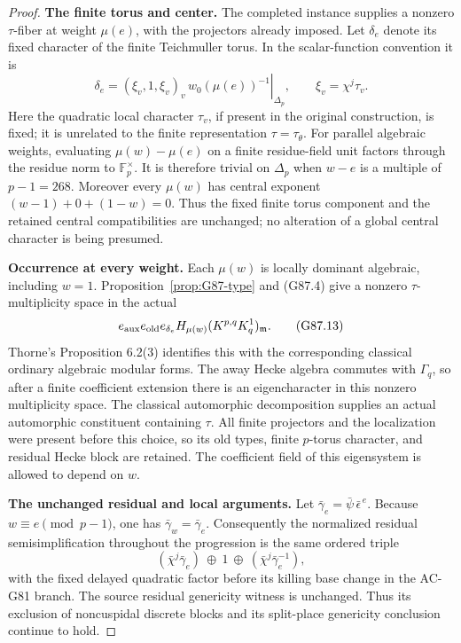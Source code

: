 \begin{proof}
\noindent\textbf{The finite torus and center.}
The completed instance supplies a nonzero \(\tau\)-fiber at weight
\(\mu(e)\), with the projectors already imposed.
Let \(\delta_e\) denote its fixed character of the finite Teichmuller
torus.  In the scalar-function convention it is
\[
 \delta_e=
 \left.(\xi_v,1,\xi_v)_v\,
         w_0(\mu(e))^{-1}\right|_{\Delta_p},
 \qquad \xi_v=\chi^j\tau_v .
 \tag{G87.12}
\]
Here the quadratic local character \(\tau_v\), if present in the
original construction, is fixed; it is unrelated to the finite
representation \(\tau=\tau_\theta\).
For parallel algebraic weights, evaluating
\(\mu(w)-\mu(e)\) on a finite residue-field unit factors through
the residue norm to \(\mathbb F_p^\times\).
It is therefore trivial on \(\Delta_p\) when
\(w-e\) is a multiple of \(p-1=268\).
Moreover every \(\mu(w)\) has central exponent
\((w-1)+0+(1-w)=0\).
Thus the fixed finite torus component and the retained central
compatibilities are unchanged; no alteration of a global central
character is being presumed.

\noindent\textbf{Occurrence at every weight.}
Each \(\mu(w)\) is locally dominant algebraic, including \(w=1\).
Proposition~\ref{prop:G87-type} and (G87.4) give a nonzero
\(\tau\)-multiplicity space in the actual
\[
 e_{\rm aux}e_{\rm old}e_{\delta_e}
 H_{\mu(w)}(K^{p,q}K_q^1)_{\mathfrak m}.
 \tag{G87.13}
\]
Thorne's Proposition 6.2(3) identifies this with the corresponding
classical ordinary algebraic modular forms.
The away Hecke algebra commutes with \(\Gamma_q\), so after a finite
coefficient extension there is an eigencharacter in this nonzero
multiplicity space. The classical automorphic decomposition supplies
an actual automorphic constituent containing \(\tau\).
All finite projectors and the localization were present before this
choice, so its old types, finite \(p\)-torus character, and residual
Hecke block are retained.
The coefficient field of this eigensystem is allowed to depend on
\(w\).

\noindent\textbf{The unchanged residual and local arguments.}
Let
\(\bar\gamma_e=\bar\psi\,\bar\epsilon^{\,e}\).
Because \(w\equiv e\pmod{p-1}\), one has
\(\bar\gamma_w=\bar\gamma_e\).
Consequently the normalized residual semisimplification throughout
the progression is the same ordered triple
\[
 (\bar\chi^j\bar\gamma_e)\ \oplus\ 1\
       \oplus\ (\bar\chi^j\bar\gamma_e^{-1}),
 \tag{G87.14}
\]
with the fixed delayed quadratic factor before its killing base
change in the AC-G81 branch.
The source residual genericity witness is unchanged.
Thus its exclusion of noncuspidal discrete blocks and its
split-place genericity conclusion continue to hold.


\end{proof}
